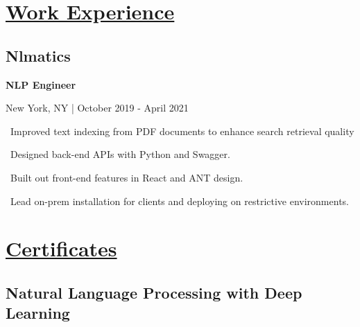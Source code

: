 \documentclass{article}
\begin{document}
\begin{minipage}[t]{0.45\textwidth\hspace{0in}}

    \section{\underline{Work Experience}}
        \vspace{-0.5em}
        \subsection{Nlmatics}
        \vspace{-0.5em}\hspace{0.1em}
        \mdseries\bfseries{NLP Engineer}
        \vspace{0.1em}
        
        \hspace{0.5em}\mdseries\textrm{New York, NY | October 2019 - April 2021}

        \vspace{0.3em}
        \hspace{1em}\textasteriskcentered \, \mdseries\textrm{Improved text indexing from PDF documents to enhance search retrieval quality}
        
        \vspace{0.3em}
        \hspace{1em}\textasteriskcentered \, \mdseries\textrm{Designed back-end APIs with Python and Swagger.}

        \vspace{0.3em}
        \hspace{1em}\textasteriskcentered \, \mdseries\textrm{Built out front-end features in React and ANT design.}
        \vspace{0.3em}
        
        \hspace{1em}\textasteriskcentered \, \mdseries\textrm{Lead on-prem installation for clients and deploying on restrictive environments.}
        \section{\underline{Certificates}}
        \subsection{Natural Language Processing with Deep Learning}
\end{minipage}
\end{document}
